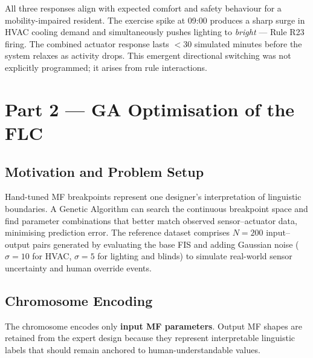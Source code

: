 \documentclass[10pt,twocolumn,a4paper]{article}
\begin{document}
All three responses align with expected comfort and safety behaviour for a mobility-impaired resident. The exercise spike at 09:00 produces a sharp surge in HVAC cooling demand and simultaneously pushes lighting to \textit{bright} --- Rule R23 firing. The combined actuator response lasts $<$30 simulated minutes before the system relaxes as activity drops. This emergent directional switching was not explicitly programmed; it arises from rule interactions.

\section{Part 2 --- GA Optimisation of the FLC}
\label{sec:part2}

\subsection{Motivation and Problem Setup}

Hand-tuned MF breakpoints represent one designer's interpretation of linguistic boundaries. A Genetic Algorithm can search the continuous breakpoint space and find parameter combinations that better match observed sensor--actuator data, minimising prediction error. The reference dataset comprises $N\!=\!200$ input--output pairs generated by evaluating the base FIS and adding Gaussian noise ($\sigma\!=\!10$ for HVAC, $\sigma\!=\!5$ for lighting and blinds) to simulate real-world sensor uncertainty and human override events.

\subsection{Chromosome Encoding}

The chromosome encodes only \textbf{input MF parameters}. Output MF shapes are retained from the expert design because they represent interpretable linguistic labels that should remain anchored to human-understandable values.
\end{document}
